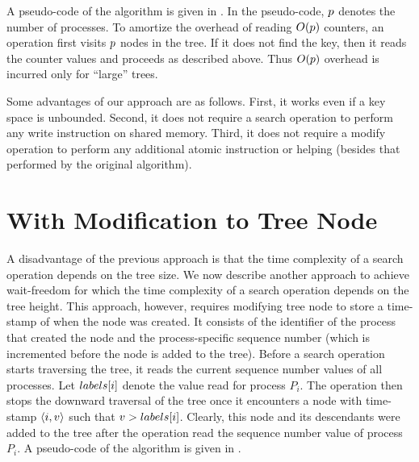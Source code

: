\begin{limitscope}
A pseudo-code of the algorithm is given in . In the pseudo-code, $p$ denotes the number of processes. To amortize the overhead of reading $O(p)$ counters, an operation first visits $p$ nodes in the tree. If it does not find the key, then it reads the counter values and proceeds as described above. Thus $O(p)$ overhead is incurred only for ``large'' trees.

Some advantages of our approach are as follows. First, it works even if a key space is unbounded. Second, it does not require a search operation to perform any write instruction on shared memory. Third, it does not require a modify operation to perform any additional atomic instruction or helping (besides that performed by the original algorithm). 



\section{With Modification to Tree Node}
A disadvantage of the previous approach is that the time complexity of a search operation depends on the tree size. We now describe another approach to achieve wait-freedom for which the time complexity of a search operation depends on the tree height. This approach, however, requires modifying tree node to store a time-stamp of when the node was created. It consists of the identifier of the process that created the node and the process-specific sequence number (which is incremented before the node is added to the tree). Before a search operation starts traversing the tree, it reads the current sequence number values of all processes. Let $labels[i]$ denote the value read for process $P_i$. The operation then stops the downward traversal of the tree once it encounters a node with time-stamp $\langle i,v \rangle$ such that $v > labels[i]$. Clearly, this node and its descendants were added to the tree after the operation read the sequence number value of process $P_i$.
A pseudo-code of the algorithm is given in .
\end{limitscope}